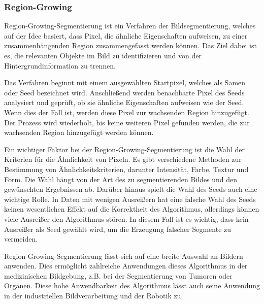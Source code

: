 \subsubsection{Region-Growing}
Region-Growing-Segmentierung ist ein Verfahren der Bildsegmentierung, welches auf der Idee basiert, dass Pixel, die ähnliche Eigenschaften aufweisen, zu einer zusammenhängenden Region zusammengefasst werden können. Das Ziel dabei ist es, die relevanten Objekte im Bild zu identifizieren und von der Hintergrundinformation zu trennen. \autocite[641]{adams_seeded_1994}

Das Verfahren beginnt mit einem ausgewählten Startpixel, welches als Samen oder Seed bezeichnet wird. Anschließend werden benachbarte Pixel des Seeds analysiert und geprüft, ob sie ähnliche Eigenschaften aufweisen wie der Seed. Wenn dies der Fall ist, werden diese Pixel zur wachsenden Region hinzugefügt. Der Prozess wird wiederholt, bis keine weiteren Pixel gefunden werden, die zur wachsenden Region hinzugefügt werden können.\autocite[641-642]{adams_seeded_1994}

Ein wichtiger Faktor bei der Region-Growing-Segmentierung ist die Wahl der Kriterien für die Ähnlichkeit von Pixeln. Es gibt verschiedene Methoden zur Bestimmung von Ähnlichkeitskriterien, darunter Intensität, Farbe, Textur und Form. Die Wahl hängt von der Art des zu segmentierenden Bildes und den gewünschten Ergebnissen ab. Darüber hinaus spielt die Wahl des Seeds auch eine wichtige Rolle. In Daten mit wenigen Ausreißern hat eine falsche Wahl des Seeds keinen wesentlichen Effekt auf die Korrektheit des Algorithmus, allerdings können viele Ausreißer den Algorithmus stören. In diesem Fall ist es wichtig, dass kein Ausreißer als Seed gewählt wird, um die Erzeugung falscher Segmente zu vermeiden. \autocite[641-643]{adams_seeded_1994}

Region-Growing-Segmentierung lässt sich auf eine breite Auswahl an Bildern anwenden. Dies ermöglicht zahlreiche Anwendungen dieses Algorithmus in der medizinischen Bildgebung, z.B. bei der Segmentierung von Tumoren oder Organen. Diese hohe Anwendbarkeit des Algorithmus lässt auch seine Anwendung in der industriellen Bildverarbeitung und der Robotik zu.\autocite[646]{adams_seeded_1994}